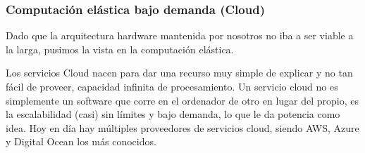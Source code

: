 \subsubsection{Computación elástica bajo demanda (Cloud)}
Dado que la arquitectura hardware mantenida por nosotros no iba a ser viable a la larga, pusimos la vista en la computación elástica.
\par Los servicios Cloud nacen para dar una recurso muy simple de explicar y no tan fácil de proveer, capacidad infinita de procesamiento. Un servicio cloud no es simplemente un software que corre en el ordenador de otro en lugar del propio, es la escalabilidad (casi) sin límites y bajo demanda, lo que le da potencia como idea. Hoy en día hay múltiples proveedores de servicios cloud, siendo AWS, Azure y Digital Ocean los más conocidos.
